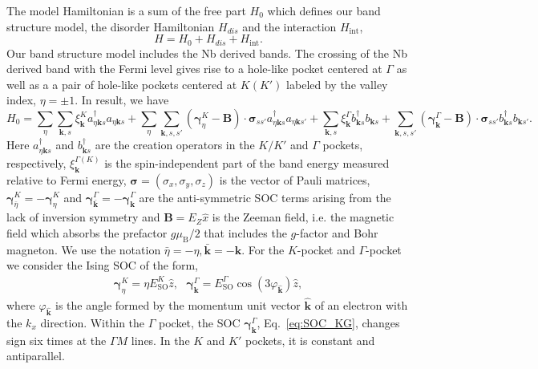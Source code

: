 \documentclass[showpacs,superscriptaddress,onecolumn,prb]{revtex4}
\begin{document}
The model Hamiltonian is a sum of the free part $H_0$ which defines our band structure model, the disorder Hamiltonian $H_{dis}$ and the interaction $H_{\mathrm{int}}$, 
\begin{equation}
H=H_{0}+ H_{dis} + H_{\mathrm{int}}. \label{eq:8.1}
\end{equation}
Our band structure model includes the Nb derived bands.
The crossing of the Nb derived band with the Fermi level gives rise to a hole-like pocket centered at $\Gamma$ as well as a a pair of hole-like pockets centered at $K(K')$ labeled by the valley index, $\eta=\pm 1$. 
In result, we have
\begin{equation}
H_{0}=\sum_{\eta}\underset{\mathbf{k},s}{\sum}\xi_{\mathbf{k}}^{K}a_{\eta\mathbf{k}s}^{\dagger}a_{\eta\mathbf{k}s}+\sum_{\eta}\underset{\mathbf{k},s,s'}{\sum}\left(\boldsymbol{\gamma}_{\eta}^{K}-\mathbf{B}\right)\cdot\boldsymbol{\sigma}_{ss'}a_{\eta\mathbf{k}s}^{\dagger}a_{\eta\mathbf{k}s'}+\underset{\mathbf{k},s}{\sum}\xi_{\mathbf{k}}^{\Gamma}b_{\mathbf{k}s}^{\dagger}b_{\mathbf{k}s}+\underset{\mathbf{k},s,s'}{\sum}\left(\boldsymbol{\gamma}_{\mathbf{k}}^{\Gamma}-\mathbf{B}\right)\cdot\boldsymbol{\sigma}_{ss'}b_{\mathbf{k}s}^{\dagger}b_{\mathbf{k}s'}.\label{eq:8.2}
\end{equation}
Here $a_{\eta\mathbf{k}s}^{\dagger}$ and $b_{\mathbf{k}s}^{\dagger}$
are the creation operators in the $K/K'$ and $\Gamma$ pockets, respectively,
$\xi_{\mathbf{k}}^{\Gamma\left(K\right)}$ is the spin-independent part of the band energy measured relative to Fermi energy,
$\boldsymbol{\sigma}=\left(\sigma_{x},\sigma_{y},\sigma_{z}\right)$
is the vector of Pauli matrices, $\boldsymbol{\gamma}_{\bar{\eta}}^{K}=-\boldsymbol{\gamma}_{\eta}^{K}$ and $\boldsymbol{\gamma}_{\bar{\mathbf{k}}}^{\Gamma}=-\boldsymbol{\gamma}_{\mathbf{k}}^{\Gamma}$ 
are the anti-symmetric SOC terms arising from the lack of inversion
symmetry and $\mathbf{B}=E_{Z}\hat{x}$ is the Zeeman field, i.e. the magnetic field which
absorbs the prefactor $g\mu_{\mathrm{B}}/2$ that includes the $g$-factor
and Bohr magneton. 
We use the notation $\bar{\eta}=-\eta,\bar{\mathbf{k}}=-\mathbf{k}$.
For the $K$-pocket and $\Gamma$-pocket we consider the Ising SOC of the form,
\begin{align}\label{eq:SOC_KG}
\boldsymbol{\gamma}_{\eta}^{K}=\eta E_{\mathrm{SO}}^{K}\hat{z},\ \ \ \boldsymbol{\gamma}_{\mathbf{k}}^{\Gamma}=E_{\mathrm{SO}}^{\Gamma}\cos\left(3\varphi_{\hat{\mathbf{k}}}\right)\hat{z},
\end{align}
where $\varphi_{\hat{\mathbf{k}}}$ is the angle formed by the momentum unit vector ${\hat{\mathbf{k}}}$ of an electron with the $k_x$ direction. 
Within the $\Gamma$ pocket, the SOC $\boldsymbol{\gamma}_{\mathbf{k}}^{\Gamma}$, Eq.~\eqref{eq:SOC_KG}, changes sign six times at the $\Gamma M$ lines.
In the $K$ and $K'$ pockets, it is constant and antiparallel.
\end{document}
